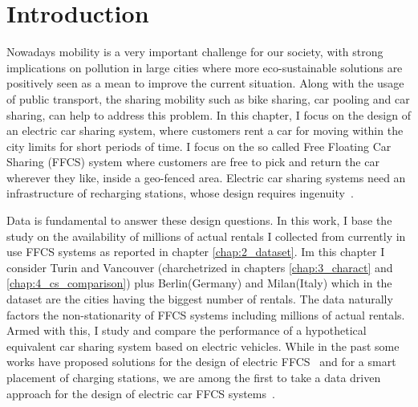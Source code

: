 \section{Introduction}
\label{sec:intro}

Nowadays mobility is a very important challenge for our society, with strong implications on pollution in large cities where more eco-sustainable solutions are positively seen as a mean to improve the current situation.
Along with the usage of public transport, the sharing mobility such as bike sharing, car pooling and car sharing, can help to address this problem. In this chapter,  I focus on the design of an electric car sharing system, where customers rent a car for moving within the city limits for short periods of time. I focus on the so called Free Floating Car Sharing (FFCS) system where customers are free to pick and return the car wherever they like, inside a geo-fenced area.
Electric car sharing systems need an infrastructure of recharging stations, whose design requires ingenuity~\cite{PlacementAndPowergrid,placementAustin,mipCSPpechino}. 

Data is fundamental to answer these design questions. In this work, I base the study on the availability of millions of actual rentals I collected from currently in use FFCS systems as reported in chapter \ref{chap:2_dataset}. 
Im this chapter I consider Turin and Vancouver (charchetrized in chapters \ref{chap:3_charact} and \ref{chap:4_cs_comparison}) plus Berlin(Germany) and Milan(Italy) which in the dataset are the cities having the biggest number of rentals.
The data naturally factors the non-stationarity of FFCS systems including millions of actual rentals. Armed with this, I study and compare the performance of a hypothetical equivalent car sharing system based on electric vehicles.  While in the past some works have proposed solutions for the design of electric FFCS~\cite{FM15,WB15} and for a smart placement of charging stations, we are among the first to take a data driven approach for the design of electric car FFCS systems~\cite{ChargingStationForVehicularNetworks,mipCSPpechino,PlacementAndPowergrid,placementAustin}.

